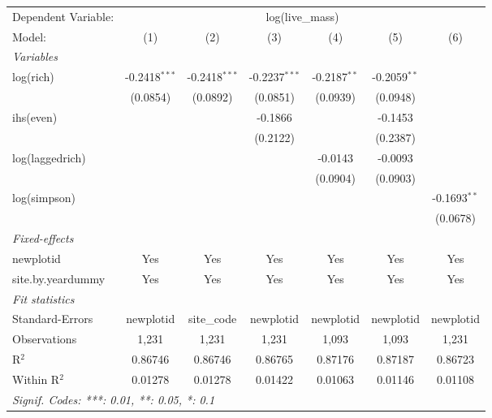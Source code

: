 \begin{tabular}{lcccccc}
\tabularnewline\midrule\midrule
Dependent Variable:&\multicolumn{6}{c}{log(live\_mass)}\\
Model:&(1) & (2) & (3) & (4) & (5) & (6)\\
\midrule \emph{Variables}&   &   &   &   &   &  \\
log(rich) & -0.2418$^{***}$ & -0.2418$^{***}$ & -0.2237$^{***}$ & -0.2187$^{**}$ & -0.2059$^{**}$ &   \\
  &(0.0854) & (0.0892) & (0.0851) & (0.0939) & (0.0948) &   \\
ihs(even) &    &    & -0.1866 &    & -0.1453 &   \\
  &   &    & (0.2122) &    & (0.2387) &   \\
log(laggedrich) &    &    &    & -0.0143 & -0.0093 &   \\
  &   &    &    & (0.0904) & (0.0903) &   \\
log(simpson) &    &    &    &    &    & -0.1693$^{**}$\\
  &   &    &    &    &    & (0.0678)\\
\midrule \emph{Fixed-effects}&   &   &   &   &   &  \\
newplotid & Yes & Yes & Yes & Yes & Yes & Yes\\
site.by.yeardummy & Yes & Yes & Yes & Yes & Yes & Yes\\
\midrule \emph{Fit statistics}&  & & & & & \\
Standard-Errors& newplotid&site\_code&newplotid&newplotid&newplotid&newplotid\\
Observations & 1,231&1,231&1,231&1,093&1,093&1,231\\
R$^2$ & 0.86746&0.86746&0.86765&0.87176&0.87187&0.86723\\
Within R$^2$ & 0.01278&0.01278&0.01422&0.01063&0.01146&0.01108\\
\midrule\midrule\multicolumn{7}{l}{\emph{Signif. Codes: ***: 0.01, **: 0.05, *: 0.1}}\\
\end{tabular}


